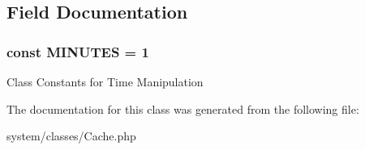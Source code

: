 \subsection{Field Documentation}
\hypertarget{class_cache_adf679c9dc5e14af2dc7ba9b332d3fae0}{
\subsubsection[{MINUTES}]{\setlength{\rightskip}{0pt plus 5cm}const {\bf MINUTES} = 1}}
\label{class_cache_adf679c9dc5e14af2dc7ba9b332d3fae0}
Class Constants for Time Manipulation 

The documentation for this class was generated from the following file:\begin{DoxyCompactItemize}
\item 
system/classes/Cache.php\end{DoxyCompactItemize}
